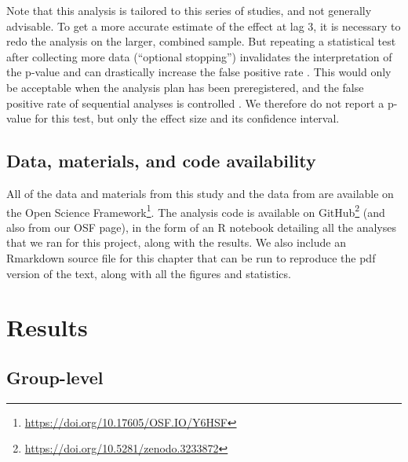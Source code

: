 \documentclass[11pt,english,]{memoir}
\let\rmarkdownfootnote\footnote%
\def\footnote{\protect\rmarkdownfootnote}
\renewcommand{\href}[2]{#2\footnote{\url{#1}}} %
\begin{document}
Note that this analysis is tailored to this series of studies, and not generally advisable. To get a more accurate estimate of the effect at lag 3, it is necessary to redo the analysis on the larger, combined sample. But repeating a statistical test after collecting more data (``optional stopping'') invalidates the interpretation of the p-value and can drastically increase the false positive rate \autocite{Simmons2011}. This would only be acceptable when the analysis plan has been preregistered, and the false positive rate of sequential analyses is controlled \autocite[for potential solutions, see][]{Lakens2014}. We therefore do not report a p-value for this test, but only the effect size and its confidence interval.

\hypertarget{data-materials-and-code-availability-1}{%
\subsection{Data, materials, and code availability}\label{data-materials-and-code-availability-1}}

All of the data and materials from this study and the data from \textcite{London2015} are available on the \href{https://doi.org/10.17605/OSF.IO/Y6HSF}{Open Science Framework}. The analysis code is available on \href{https://doi.org/10.5281/zenodo.3233872}{GitHub} (and also from our OSF page), in the form of an R notebook detailing all the analyses that we ran for this project, along with the results. We also include an Rmarkdown \autocite{Xie2018} source file for this chapter that can be run to reproduce the pdf version of the text, along with all the figures and statistics.

\hypertarget{AB_tDCS-results}{%
\section{Results}\label{AB_tDCS-results}}

\hypertarget{group-level}{%
\subsection{Group-level}\label{group-level}}
\end{document}
